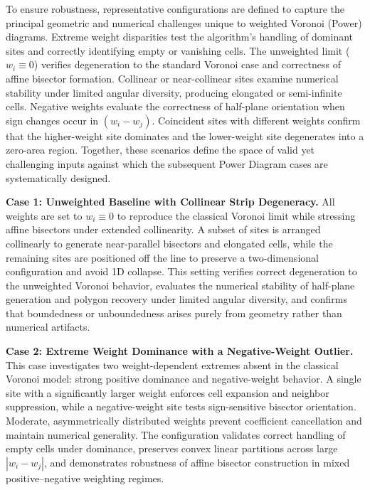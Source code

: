 \documentclass{article}
\begin{document}
To ensure robustness, representative configurations are defined to capture the principal geometric and numerical challenges unique to weighted Voronoi (Power) diagrams.  
Extreme weight disparities test the algorithm’s handling of dominant sites and correctly identifying empty or vanishing cells.  
The unweighted limit (\(w_i\!\equiv\!0\)) verifies degeneration to the standard Voronoi case and correctness of affine bisector formation.  
Collinear or near-collinear sites examine numerical stability under limited angular diversity, producing elongated or semi-infinite cells.  
Negative weights evaluate the correctness of half-plane orientation when sign changes occur in \((w_i-w_j)\).  
Coincident sites with different weights confirm that the higher-weight site dominates and the lower-weight site degenerates into a zero-area region.  
Together, these scenarios define the space of valid yet challenging inputs against which the subsequent Power Diagram cases are systematically designed.


\textbf{Case 1: Unweighted Baseline with Collinear Strip Degeneracy.}  
All weights are set to \(w_i\!\equiv\!0\) to reproduce the classical Voronoi limit while stressing affine bisectors under extended collinearity.  
A subset of sites is arranged collinearly to generate near-parallel bisectors and elongated cells, while the remaining sites are positioned off the line to preserve a two-dimensional configuration and avoid 1D collapse.  
This setting verifies correct degeneration to the unweighted Voronoi behavior, evaluates the numerical stability of half-plane generation and polygon recovery under limited angular diversity, and confirms that boundedness or unboundedness arises purely from geometry rather than numerical artifacts.

\textbf{Case 2: Extreme Weight Dominance with a Negative-Weight Outlier.}  
This case investigates two weight-dependent extremes absent in the classical Voronoi model: strong positive dominance and negative-weight behavior.  
A single site with a significantly larger weight enforces cell expansion and neighbor suppression, while a negative-weight site tests sign-sensitive bisector orientation.  
Moderate, asymmetrically distributed weights prevent coefficient cancellation and maintain numerical generality.  
The configuration validates correct handling of empty cells under dominance, preserves convex linear partitions across large \(|w_i-w_j|\), and demonstrates robustness of affine bisector construction in mixed positive–negative weighting regimes.
\end{document}

